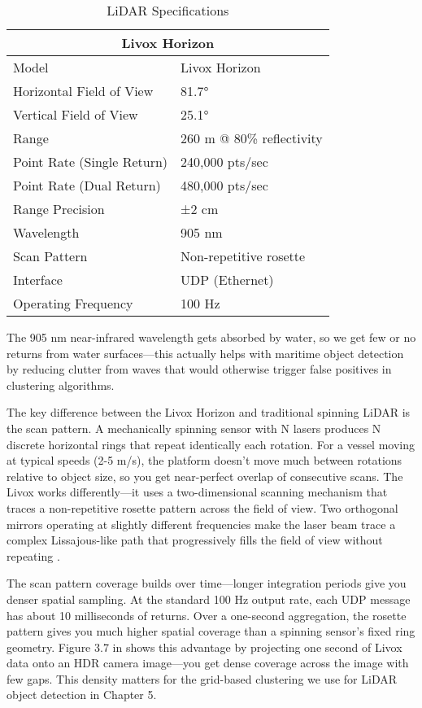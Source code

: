 \documentclass{erauthesis}
\begin{document}
\begin{table}[h]
\centering
\caption{LiDAR Specifications}
\begin{tabular}{ll}
\hline
\multicolumn{2}{c}{Livox Horizon}\\
\hline
\hline
Model & Livox Horizon \\
Horizontal Field of View & 81.7° \\
Vertical Field of View & 25.1° \\
Range & 260 m @ 80\% reflectivity \\
Point Rate (Single Return) & 240,000 pts/sec \\
Point Rate (Dual Return) & 480,000 pts/sec \\
Range Precision & ±2 cm \\
Wavelength & 905 nm \\
Scan Pattern & Non-repetitive rosette \\
Interface & UDP (Ethernet) \\
Operating Frequency & 100 Hz \\
\hline
\end{tabular}
\label{tab:livox_horizon_specs}
\end{table}

The 905 nm near-infrared wavelength gets absorbed by water, so we get few or no returns from water surfaces—this actually helps with maritime object detection by reducing clutter from waves that would otherwise trigger false positives in clustering algorithms.

The key difference between the Livox Horizon and traditional spinning \ac{LiDAR} is the scan pattern.
A mechanically spinning sensor with N lasers produces N discrete horizontal rings that repeat identically each rotation.
For a vessel moving at typical speeds (2-5 m/s), the platform doesn't move much between rotations relative to object size, so you get near-perfect overlap of consecutive scans.
The Livox works differently—it uses a two-dimensional scanning mechanism that traces a non-repetitive rosette pattern across the field of view.
Two orthogonal mirrors operating at slightly different frequencies make the laser beam trace a complex Lissajous-like path that progressively fills the field of view without repeating \cite{thompson2023}.

The scan pattern coverage builds over time—longer integration periods give you denser spatial sampling.
At the standard 100 Hz output rate, each UDP message has about 10 milliseconds of returns.
Over a one-second aggregation, the rosette pattern gives you much higher spatial coverage than a spinning sensor's fixed ring geometry.
Figure 3.7 in \cite{thompson2023} shows this advantage by projecting one second of Livox data onto an \ac{HDR} camera image—you get dense coverage across the image with few gaps.
This density matters for the grid-based clustering we use for \ac{LiDAR} object detection in Chapter 5.
\end{document}
